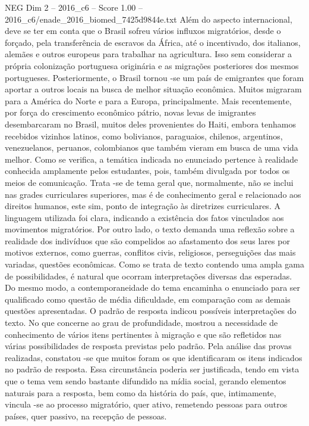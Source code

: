 \begin{textsample}{NEG Dim 2 – 2016\_c6 – Score 1.00 – 2016\_c6/enade\_2016\_biomed\_7425d9844e.txt}
Além do aspecto internacional, deve se ter em conta que o Brasil sofreu vários influxos migratórios, desde o forçado, pela transferência de escravos da África, até o incentivado, dos italianos, alemães e outros europeus para trabalhar na agricultura.
Isso sem considerar a própria colonização portuguesa originária e as migrações posteriores dos mesmos portugueses.
Posteriormente, o Brasil tornou -se um país de emigrantes que foram aportar a outros locais na busca de melhor situação econômica.
Muitos migraram para a América do Norte e para a Europa, principalmente.
Mais recentemente, por força do crescimento econômico pátrio, novas levas de imigrantes desembarcaram no Brasil, muitos deles provenientes do Haiti, embora tenhamos recebidos vizinhos latinos, como bolivianos, paraguaios, chilenos, argentinos, venezuelanos, peruanos, colombianos que também vieram em busca de uma vida melhor.
Como se verifica, a temática indicada no enunciado pertence à realidade conhecida amplamente pelos estudantes, pois, também divulgada por todos os meios de comunicação.
Trata -se de tema geral que, normalmente, não se inclui nas grades curriculares superiores, mas é de conhecimento geral e relacionado aos direitos humanos, este sim, ponto de integração às diretrizes curriculares.
A linguagem utilizada foi clara, indicando a existência dos fatos vinculados aos movimentos migratórios.
Por outro lado, o texto demanda uma reflexão sobre a realidade dos indivíduos que são compelidos ao afastamento dos seus lares por motivos externos, como guerras, conflitos civis, religiosos, perseguições das mais variadas, questões econômicas.
Como se trata de texto contendo uma ampla gama de possibilidades, é natural que ocorram interpretações diversas das esperadas.
Do mesmo modo, a contemporaneidade do tema encaminha o enunciado para ser qualificado como questão de média dificuldade, em comparação com as demais questões apresentadas.
O padrão de resposta indicou possíveis interpretações do texto.
No que concerne ao grau de profundidade, mostrou a necessidade de conhecimento de vários itens pertinentes à migração e que são refletidos nas várias possibilidades de resposta previstas pelo padrão.
Pela análise das provas realizadas, constatou -se que muitos foram os que identificaram os itens indicados no padrão de resposta.
Essa circunstância poderia ser justificada, tendo em vista que o tema vem sendo bastante difundido na mídia social, gerando elementos naturais para a resposta, bem como da história do país, que, intimamente, vincula -se ao processo migratório, quer ativo, remetendo pessoas para outros países, quer passivo, na recepção de pessoas.

\end{textsample}
